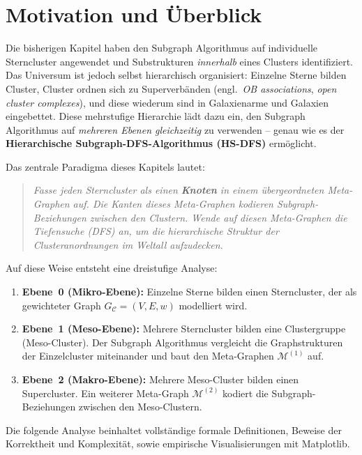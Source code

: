 ﻿\documentclass[a4paper,12pt]{report}
\theoremstyle{definition}
\begin{document}
\section{Motivation und Überblick}
\label{ssec:hsdfs_motivation}

Die bisherigen Kapitel haben den Subgraph Algorithmus auf individuelle Sterncluster angewendet und Substrukturen \emph{innerhalb} eines Clusters identifiziert. Das Universum ist jedoch selbst hierarchisch organisiert: Einzelne Sterne bilden Cluster, Cluster ordnen sich zu Superverbänden (engl.\ \emph{OB associations}, \emph{open cluster complexes}), und diese wiederum sind in Galaxienarme und Galaxien eingebettet. Diese mehrstufige Hierarchie lädt dazu ein, den Subgraph Algorithmus auf \emph{mehreren Ebenen gleichzeitig} zu verwenden -- genau wie es der \textbf{Hierarchische Subgraph-DFS-Algorithmus (HS-DFS)} \cite{epp2026msubgraph} ermöglicht.

\medskip

Das zentrale Paradigma dieses Kapitels lautet:
\begin{quote}
\emph{Fasse jeden Sterncluster als einen \textbf{Knoten} in einem übergeordneten
Meta-Graphen auf. Die Kanten dieses Meta-Graphen kodieren Subgraph-Beziehungen
zwischen den Clustern. Wende auf diesen Meta-Graphen die Tiefensuche (DFS) an,
um die hierarchische Struktur der Clusteranordnungen im Weltall aufzudecken.}
\end{quote}

Auf diese Weise entsteht eine dreistufige Analyse:
\begin{enumerate}
    \item \textbf{Ebene~0 (Mikro-Ebene):} Einzelne Sterne bilden einen Sterncluster, der als gewichteter Graph $G_\mathcal{C} = (V, E, w)$ modelliert wird.
    \item \textbf{Ebene~1 (Meso-Ebene):} Mehrere Sterncluster bilden eine Clustergruppe (Meso-Cluster). Der Subgraph Algorithmus vergleicht die Graphstrukturen der Einzelcluster miteinander und baut den Meta-Graphen $\mathcal{M}^{(1)}$ auf.
    \item \textbf{Ebene~2 (Makro-Ebene):} Mehrere Meso-Cluster bilden einen Supercluster. Ein weiterer Meta-Graph $\mathcal{M}^{(2)}$ kodiert die Subgraph-Beziehungen zwischen den Meso-Clustern.
\end{enumerate}

Die folgende Analyse beinhaltet vollständige formale Definitionen, Beweise der Korrektheit und Komplexität, sowie empirische Visualisierungen mit Matplotlib.
\end{document}

